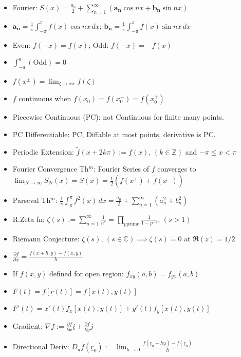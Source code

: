 \documentclass[10pt]{article}
\begin{document}
\begin{multicols}{2}
\begin{itemize}
    \item Fourier: $S(x)=\frac{a_{0}}{2}+\sum^{\infty}_{n=1}(\mathbf{a_{n}}\cos{nx}+\mathbf{b_{n}}\sin{nx})$
    \item $\mathbf{a_{n}}=\frac{1}{\pi}\int^{\pi}_{-\pi}f(x)\cos{nx}\,dx$; $\mathbf{b_{n}}=\frac{1}{\pi}\int^{\pi}_{-\pi}f(x)\sin{nx}\,dx$
    \item Even: $f(-x)=f(x)$; Odd: $f(-x)=-f(x)$
    \item $\int^{a}_{-a}(\text{Odd})=0$
    \item $f(x^{\pm})=\lim_{\zeta\to x^{\pm}}f(\zeta)$
    \item $f$ continuous when $f(x_{0})=f(x_{0}^{-})=f(x_{0}^{+})$
    \item Piecewise Continuous (PC): not Continuous for finite many points.
    \item PC Differentiable: PC, Diffable at most points, derivative is PC.
    \item Periodic Extension: $\widetilde{f}(x+2k\pi):=f(x),\,(k\in\mathbb{Z})$ and $-\pi\leq x<\pi$
    \item Fourier Convergence Th$^{\underline{m}}$: Fourier Series of $f$ converges to $\lim_{N\to\infty}S_{N}(x)=S(x)=\frac{1}{2}(\widetilde{f}(x^{+})+\widetilde{f}(x^{-}))$
    \item Parseval Th$^{\underline{m}}$: $\frac{1}{\pi}\int^{\pi}_{\pi}f^{2}(x)\,dx=\frac{a_{0}}{2}+\sum^{\infty}_{n=1}(a_{n}^{2}+b_{n}^{2})$
    \item R.Zeta fn: $\zeta(s):=\sum^{\infty}_{n=1}\frac{1}{n^{s}}=\prod_{p\text{prime}}\frac{1}{1-p^{-s}},\,(s>1)$
    \item Riemann Conjecture: $\zeta(s),\,(s\in\mathbb{C})\implies\zeta(s)=0$ at $\Re(z)=1/2$
    \item $\frac{\partial f}{\partial x}=\frac{f(x+h,y)-f(x,y)}{h}$
    \item If $f(x,y)$ defined for open region: $f_{xy}(a,b)=f_{yx}(a,b)$
    \item $F(t)=f[\underline{r}(t)]=f[x(t),y(t)]$
    \item $F'(t)=x'(t)f_{x}[x(t),y(t)]+y'(t)f_{y}[x(t),y(t)]$
    \item Gradient: $\nabla f:=\frac{\partial f}{\partial x}\underline{i}+\frac{\partial f}{\partial y}\underline{j}$
    \item Directional Deriv: $D_{\underline{u}}f(\underline{r}_{0}):=\lim_{h\to0}\frac{f(\underline{r}_{0}+h\underline{u})-f(\underline{r}_{0})}{h}$

\end{itemize}
\end{multicols}
\end{document}
